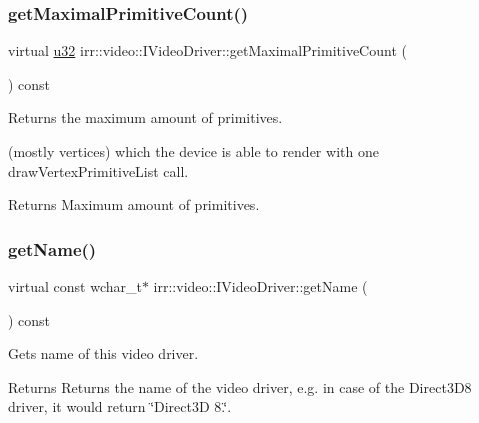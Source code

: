 \subsubsection{\texorpdfstring{get\+Maximal\+Primitive\+Count()}{getMaximalPrimitiveCount()}\hspace{0.1cm}{\footnotesize\ttfamily [2/2]}}
{\footnotesize\ttfamily virtual \hyperlink{namespaceirr_a0416a53257075833e7002efd0a18e804}{u32} irr\+::video\+::\+I\+Video\+Driver\+::get\+Maximal\+Primitive\+Count (\begin{DoxyParamCaption}{ }\end{DoxyParamCaption}) const\hspace{0.3cm}{\ttfamily [pure virtual]}}



Returns the maximum amount of primitives. 

(mostly vertices) which the device is able to render with one draw\+Vertex\+Primitive\+List call. \begin{DoxyReturn}{Returns}
Maximum amount of primitives. 
\end{DoxyReturn}
\mbox{\label{classirr_1_1video_1_1IVideoDriver_a87ca51832295b2dceaa1e258daf863f1}} 
\subsubsection{\texorpdfstring{get\+Name()}{getName()}\hspace{0.1cm}{\footnotesize\ttfamily [1/2]}}
{\footnotesize\ttfamily virtual const wchar\+\_\+t$\ast$ irr\+::video\+::\+I\+Video\+Driver\+::get\+Name (\begin{DoxyParamCaption}{ }\end{DoxyParamCaption}) const\hspace{0.3cm}{\ttfamily [pure virtual]}}



Gets name of this video driver. 

\begin{DoxyReturn}{Returns}
Returns the name of the video driver, e.\+g. in case of the Direct3\+D8 driver, it would return \char`\"{}\+Direct3\+D 8.\char`\"{}. 
\end{DoxyReturn}
\mbox{\label{classirr_1_1video_1_1IVideoDriver_a87ca51832295b2dceaa1e258daf863f1}} 
